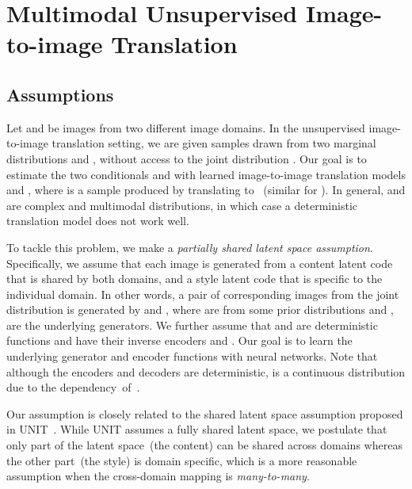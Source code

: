 \documentclass[runningheads]{llncs}
\begin{document}
	
	\section{Multimodal Unsupervised Image-to-image Translation}
	\label{sec:framework}
	


	
	\subsection{Assumptions}
	\label{sec:assumptions}
	
	Let  and  be images from two different image domains. In the unsupervised image-to-image translation setting, we are given samples drawn from two marginal distributions  and , without access to the joint distribution . Our goal is to estimate the two conditionals  and  with learned image-to-image translation models  and , where  is a sample produced by translating  to ~(similar for ). In general,  and  are complex and multimodal distributions, in which case a deterministic translation model does not work well.
	
	To tackle this problem, we make a \textit{partially shared latent space assumption}. Specifically, we assume that each image  is generated from a content latent code  that is shared by both domains, and a style latent code  that is specific to the individual domain. In other words, a pair of corresponding images  from the joint distribution is generated by  and , where  are from some prior distributions and ,  are the underlying generators. We further assume that  and  are deterministic functions and have their inverse encoders  and . 
Our goal is to learn the underlying generator and encoder functions with neural networks. Note that although the encoders and decoders are deterministic,  is a continuous distribution due to the \mbox{dependency of }.
	
	
	Our assumption is closely related to the shared latent space assumption proposed in UNIT~\cite{liu2017unsupervised}. While UNIT assumes a fully shared latent space, we postulate that only part of the latent space~(the content) can be shared across domains whereas the other part~(the style) is domain specific, which is a more reasonable assumption when the cross-domain mapping is \emph{many-to-many}. 
\end{document}
